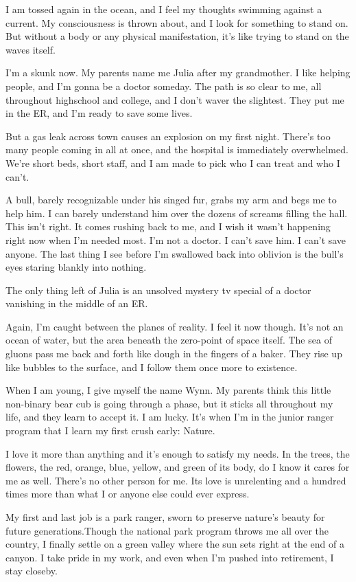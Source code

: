 I am tossed again in the ocean, and I feel my thoughts swimming against a current. My consciousness is thrown about, and I look for something to stand on. But without a body or any physical manifestation, it's like trying to stand on the waves itself.

I'm a skunk now. My parents name me Julia after my grandmother. I like helping people, and I'm gonna be a doctor someday. The path is so clear to me, all throughout highschool and college, and I don't waver the slightest. They put me in the ER, and I'm ready to save some lives.

But a gas leak across town causes an explosion on my first night. There's too many people coming in all at once, and the hospital is immediately overwhelmed. We're short beds, short staff, and I am made to pick who I can treat and who I can't.

A bull, barely recognizable under his singed fur, grabs my arm and begs me to help him. I can barely understand him over the dozens of screams filling the hall. This isn't right. It comes rushing back to me, and I wish it wasn't happening right now when I'm needed most. I'm not a doctor. I can't save him. I can't save anyone. The last thing I see before I'm swallowed back into oblivion is the bull's eyes staring blankly into nothing.

The only thing left of Julia is an unsolved mystery tv special of a doctor vanishing in the middle of an ER.

Again, I'm caught between the planes of reality. I feel it now though. It's not an ocean of water, but the area beneath the zero-point of space itself. The sea of gluons pass me back and forth like dough in the fingers of a baker. They rise up like bubbles to the surface, and I follow them once more to existence.

When I am young, I give myself the name Wynn. My parents think this little non-binary bear cub is going through a phase, but it sticks all throughout my life, and they learn to accept it. I am lucky. It's when I'm in the junior ranger program that I learn my first crush early: Nature.

I love it more than anything and it's enough to satisfy my needs. In the trees, the flowers, the red, orange, blue, yellow, and green of its body, do I know it cares for me as well. There's no other person for me. Its love is unrelenting and a hundred times more than what I or anyone else could ever express.

My first and last job is a park ranger, sworn to preserve nature's beauty for future generations.Though the national park program throws me all over the country, I finally settle on a green valley where the sun sets right at the end of a canyon. I take pride in my work, and even when I'm pushed into retirement, I stay closeby.

